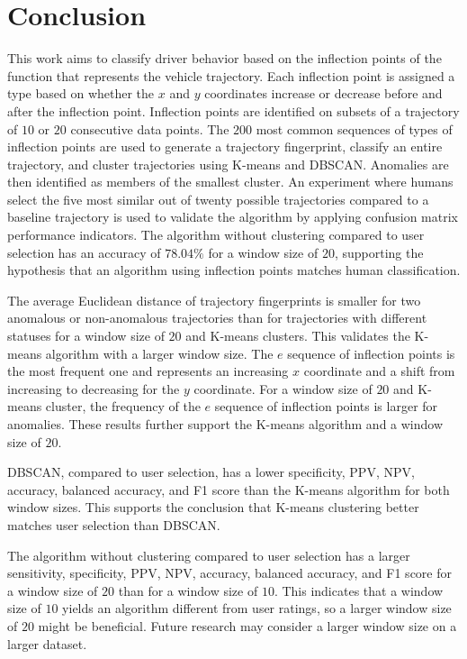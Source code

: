 \documentclass[preprint,12pt]{elsarticle}
\begin{document}
\section{Conclusion}
\label{sec:Conclusion}

This work aims to classify driver behavior based on the inflection points of the function that represents the vehicle trajectory. Each inflection point is assigned a type based on whether the $x$ and $y$ coordinates increase or decrease before and after the inflection point. Inflection points are identified on subsets of a trajectory of $10$ or $20$ consecutive data points. The $200$ most common sequences of types of inflection points are used to generate a trajectory fingerprint, classify an entire trajectory, and cluster trajectories using K-means and DBSCAN. Anomalies are then identified as members of the smallest cluster. An experiment where humans select the five most similar out of twenty possible trajectories compared to a baseline trajectory is used to validate the algorithm by applying confusion matrix performance indicators. The algorithm without clustering compared to user selection has an accuracy of $78.04\%$ for a window size of $20$, supporting the hypothesis that an algorithm using inflection points matches human classification.

The average Euclidean distance of trajectory fingerprints is smaller for two anomalous or non-anomalous trajectories than for trajectories with different statuses for a window size of $20$ and K-means clusters. This validates the K-means algorithm with a larger window size. The $e$ sequence of inflection points is the most frequent one and represents an increasing $x$ coordinate and a shift from increasing to decreasing for the $y$ coordinate. For a window size of $20$ and K-means cluster, the frequency of the $e$ sequence of inflection points is larger for anomalies. These results further support the K-means algorithm and a window size of $20$.

DBSCAN, compared to user selection, has a lower specificity, PPV, NPV, accuracy, balanced accuracy, and F1 score than the K-means algorithm for both window sizes. This supports the conclusion that K-means clustering better matches user selection than DBSCAN.

The algorithm without clustering compared to user selection has a larger sensitivity, specificity, PPV, NPV, accuracy, balanced accuracy, and F1 score for a window size of $20$ than for a window size of $10$. This indicates that a window size of $10$ yields an algorithm different from user ratings, so a larger window size of $20$ might be beneficial. Future research may consider a larger window size on a larger dataset.
\end{document}

